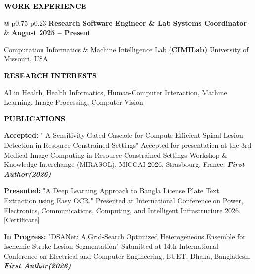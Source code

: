\documentclass[a4paper]{article}
\begin{document}
    \textcolor{black}{\textbf{WORK EXPERIENCE}}
    \vspace{-0.6em}
    \\\noindent{\color{black} \rule{\linewidth}{0.1mm}}
    \noindent
    \begin{tabular*}{\textwidth}{@{\extracolsep{\fill}} p{0.75\textwidth} p{0.23\textwidth}}
    \textbf{Research Software Engineer \& Lab Systems Coordinator}
    & \raggedleft \textbf{August 2025 -- Present}
    \end{tabular*}
    \begin{minipage}{\textwidth}
    Computation Informatics \& Machine Intelligence Lab
    \textbf{\href{https://pronad1.github.io/CIMILab/index.html}{(CIMILab)}} \hfill \raggedleft University of Missouri, USA
    \end{minipage}

    \vspace{4pt}

    \textcolor{black}{\textbf{RESEARCH INTERESTS}}
    \vspace{-0.6em}\\
    \noindent{\color{black} \rule{\linewidth}{0.1mm}}
    \noindent
    \begin{minipage}{\textwidth}
    AI in Health, Health Informatics, Human-Computer Interaction, Machine Learning, Image Processing, Computer Vision
    \end{minipage}

    \vspace{4pt}
    
    \textcolor{black}{\textbf{PUBLICATIONS}}\vspace{-0.6em}\\
    \noindent{\color{black} \rule{\linewidth}{0.1mm}}

    \noindent \textbf{Accepted: } "	A Sensitivity-Gated Cascade for Compute-Efficient Spinal Lesion Detection in Resource-Constrained Settings" Accepted for presentation at the 3rd Medical Image Computing in Resource-Constrained Settings Workshop \& Knowledge Interchange (MIRASOL), MICCAI 2026, Strasbourg, France. \textit{\textbf{First Author(2026)}}

    \noindent \textbf{Presented: } "A Deep Learning Approach to Bangla License Plate Text Extraction using Easy OCR." Presented at International Conference on Power, Electronics, Communications, Computing, and Intelligent Infrastructure 2026. \href{https://drive.google.com/file/d/19hQWe6rTojGQuWsK58hnAklbj_ZK4kIA/view}{[Certificate]}

    \noindent \textbf{In Progress: } "DSANet: A Grid-Search Optimized Heterogeneous Ensemble for Ischemic Stroke Lesion Segmentation" Submitted at 14th International Conference on Electrical and Computer Engineering, BUET, Dhaka, Bangladesh. \textit{\textbf{First Author(2026)}}
    
\end{document}
